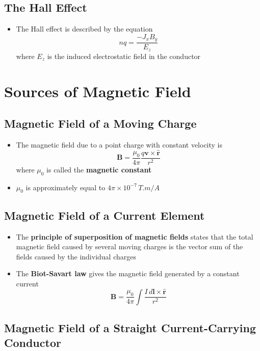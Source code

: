 \documentclass{article}
\begin{document}
\setcounter{subsection}{8}
\subsection{The Hall Effect}

\begin{itemize}
  \item The Hall effect is described by the equation \[n q = \frac{-J_x B_y}{E_z}\] where $E_z$ is the induced electrostatic field in the conductor
\end{itemize}

\section{Sources of Magnetic Field}

\subsection{Magnetic Field of a Moving Charge}

\begin{itemize}
  \item The magnetic field due to a point charge with constant velocity is \[\mathbf{B} = \frac{\mu_0}{4 \pi} \frac{q \mathbf{v} \times \hat{\mathbf{r}}}{r^2}\] where $\mu_0$ is called the \textbf{magnetic constant}

  \item $\mu_0$ is approximately equal to $4 \pi \times 10^{-7}\, \unit{T . m / A}$
\end{itemize}

\subsection{Magnetic Field of a Current Element}

\begin{itemize}
  \item The \textbf{principle of superposition of magnetic fields} states that the total magnetic field caused by several moving charges is the vector sum of the fields caused by the individual charges

  \item The \textbf{Biot-Savart law} gives the magnetic field generated by a constant current \[\mathbf{B} = \frac{\mu_0}{4 \pi} \int \frac{I \,d\mathbf{l} \times \hat{\mathbf{r}}}{r^2}\]
\end{itemize}

\subsection{Magnetic Field of a Straight Current-Carrying Conductor}
\end{document}
